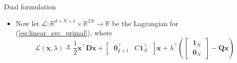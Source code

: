 \documentclass{beamer}
\numberwithin{equation}{section}
\newcommand{\aref}[1]{\alert{\ref{#1}}}
\begin{document}
\begin{frame}{Dual formulation}
\begin{itemize}
        \item
        Now let $ \mathcal{L} : \mathbb{R}^{d + N + 1} \times \mathbb{R}^{2N}
        \rightarrow \mathbb{R} $ be the Lagrangian for
        (\aref{eq:linear_svc_primal}), where
        \begin{equation} \label{eq:linear_svc_lagrangian}
            \mathcal{L}(\mathbf{x}, \lambda) \triangleq
            \frac{1}{2}\mathbf{x}^\top\mathbf{D}\mathbf{x} + \begin{bmatrix}
                \ \mathbf{0}_{d + 1}^\top & C\mathbf{1}_N^\top \
            \end{bmatrix}\mathbf{x} +
            \lambda^\top\left(
                \begin{bmatrix}
                    \ \mathbf{1}_N \ \\ \ \mathbf{0}_N \
                \end{bmatrix} -
                \mathbf{Q}\mathbf{x}
            \right)
        \end{equation}
    \end{itemize}
\end{frame}
\end{document}
